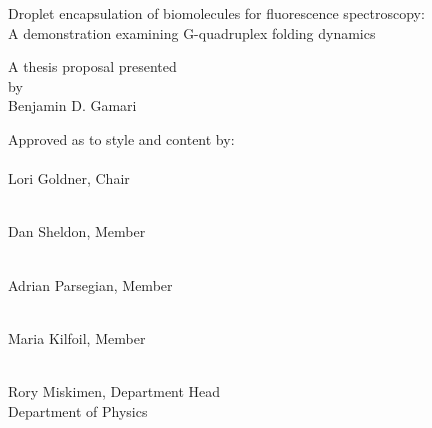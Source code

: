 \begin{center}
\large{
Droplet encapsulation of biomolecules for fluorescence spectroscopy: \\
A demonstration examining G-quadruplex folding dynamics
}
\end{center}
\vspace{10em}
\begin{center}
A thesis proposal presented \\
by \\
{\sc Benjamin D. Gamari}
\end{center}
\vspace{10em}

Approved as to style and content by:\\

\makebox[2.5in]{\hrulefill} \\
Lori Goldner, Chair

\makebox[2.5in]{\hrulefill} \\
Dan Sheldon, Member

\makebox[2.5in]{\hrulefill} \\
Adrian Parsegian, Member

\makebox[2.5in]{\hrulefill} \\
Maria Kilfoil, Member

\vspace{10em}
\hspace{20em}
\parbox[t]{3in}{
\makebox[2.5in]{\hrulefill} \\
\hspace{20em} Rory Miskimen, Department Head \\
\hspace{20em} Department of Physics
}